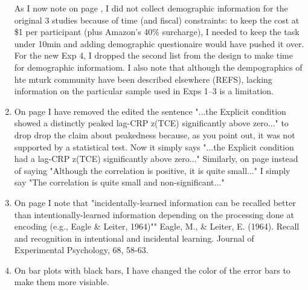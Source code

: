 \documentclass[12pt]{article}
\begin{document}
\begin{enumerate}
	As I now note on page \pageref{TODO-10}, I did not collect demographic information for the original 3 studies because of time (and fiscal) constraints: to keep the cost at \$1 per participant (plus Amazon's 40\% surcharge), I needed to keep the task under 10min and adding demographic questionaire would have pushed it over. For the new Exp 4, I dropped the second list from the design to make time for demographic informatiom. I also note that although the dempographics of hte mturk community have been described elsewhere (REFS), lacking information on the particular sample used in Exps 1--3 is a limitation.

\item
	On page \pageref{done-11} I have removed the edited the sentence "...the Explicit condition showed a distinctly peaked lag-CRP z(TCE) significantly above zero..." to drop drop the claim about peakedness because, as you point out, it was not supported by a statistical test. Now it simply says "...the Explicit condition had a lag-CRP z(TCE) significantly above zero..."
	Similarly, on page \pageref{done-12} instead of saying "Although the correlation is positive, it is quite small..." I simply say "The correlation is quite small and non-significant..."

\item
	On page \pageref{TODO-13} I note that "incidentally-learned information can be recalled better than intentionally-learned information depending on the processing done at encoding (e.g., Eagle \& Leiter, 1964)""
	Eagle, M., \& Leiter, E. (1964). Recall and recognition in intentional and incidental learning. Journal of Experimental Psychology, 68, 58-63.

\item
	\pageref{TODO-14} On bar plots with black bars, I have changed the color of the error bars to make them more visiable. 


\end{enumerate}
\end{document}
